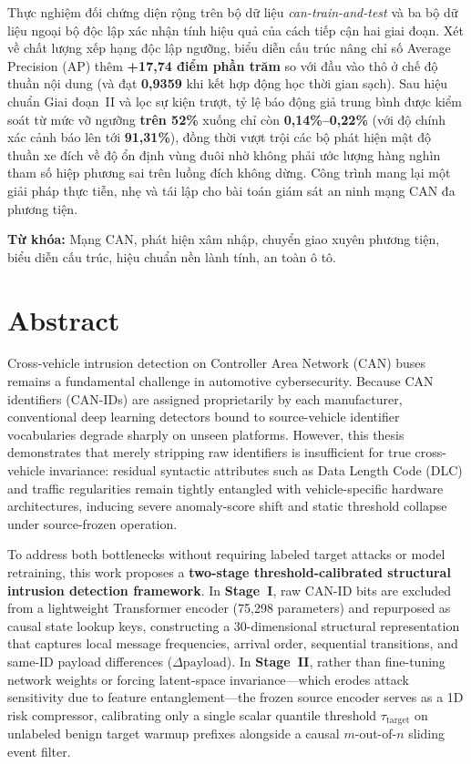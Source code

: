 \documentclass[12pt, a4paper, reqno, oneside]{book}
\newcommand\chap[1]{%
  \clearpage\phantomsection%
  \chapter*{#1}%
  \addcontentsline{toc}{chapter}{#1}%
  \markboth{#1}{}%
}
\begin{document}
Thực nghiệm đối chứng diện rộng trên bộ dữ liệu \textit{can-train-and-test} và ba bộ dữ liệu ngoại bộ độc lập xác nhận tính hiệu quả của cách tiếp cận hai giai đoạn. Xét về chất lượng xếp hạng độc lập ngưỡng, biểu diễn cấu trúc nâng chỉ số Average Precision (AP) thêm \textbf{+17,74 điểm phần trăm} so với đầu vào thô ở chế độ thuần nội dung (và đạt \textbf{0,9359} khi kết hợp động học thời gian sạch). Sau hiệu chuẩn Giai đoạn~II và lọc sự kiện trượt, tỷ lệ báo động giả trung bình được kiểm soát từ mức vỡ ngưỡng \textbf{trên 52\%} xuống chỉ còn \textbf{0,14\%--0,22\%} (với độ chính xác cảnh báo lên tới \textbf{91,31\%}), đồng thời vượt trội các bộ phát hiện mật độ thuần xe đích về độ ổn định vùng đuôi nhờ không phải ước lượng hàng nghìn tham số hiệp phương sai trên luồng đích không dừng. Công trình mang lại một giải pháp thực tiễn, nhẹ và tái lập cho bài toán giám sát an ninh mạng CAN đa phương tiện.

\medskip
\noindent\textbf{Từ khóa:} Mạng CAN, phát hiện xâm nhập, chuyển giao xuyên phương tiện, biểu diễn cấu trúc, hiệu chuẩn nền lành tính, an toàn ô tô.
\newpage

\chap{Abstract}
\vspace{-10pt}

Cross-vehicle intrusion detection on Controller Area Network (CAN) buses remains a fundamental challenge in automotive cybersecurity. Because CAN identifiers (CAN-IDs) are assigned proprietarily by each manufacturer, conventional deep learning detectors bound to source-vehicle identifier vocabularies degrade sharply on unseen platforms. However, this thesis demonstrates that merely stripping raw identifiers is insufficient for true cross-vehicle invariance: residual syntactic attributes such as Data Length Code (DLC) and traffic regularities remain tightly entangled with vehicle-specific hardware architectures, inducing severe anomaly-score shift and static threshold collapse under source-frozen operation.

To address both bottlenecks without requiring labeled target attacks or model retraining, this work proposes a \textbf{two-stage threshold-calibrated structural intrusion detection framework}. In \textbf{Stage~I}, raw CAN-ID bits are excluded from a lightweight Transformer encoder (75,298 parameters) and repurposed as causal state lookup keys, constructing a 30-dimensional structural representation that captures local message frequencies, arrival order, sequential transitions, and same-ID payload differences ($\Delta\text{payload}$). In \textbf{Stage~II}, rather than fine-tuning network weights or forcing latent-space invariance—which erodes attack sensitivity due to feature entanglement—the frozen source encoder serves as a 1D risk compressor, calibrating only a single scalar quantile threshold $\tau_{\text{target}}$ on unlabeled benign target warmup prefixes alongside a causal $m$-out-of-$n$ sliding event filter.
\end{document}
